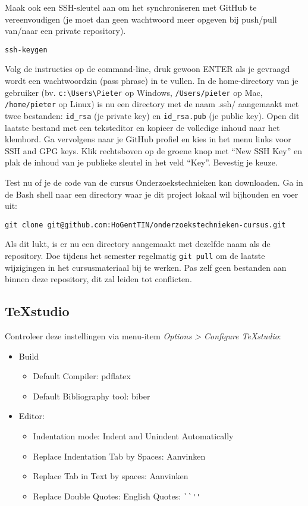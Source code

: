 Maak ook een SSH-sleutel aan om het synchroniseren met GitHub te vereenvoudigen (je moet dan geen wachtwoord meer opgeven bij push/pull van/naar een private repository).

\begin{verbatim}
ssh-keygen
\end{verbatim}

Volg de instructies op de command-line, druk gewoon ENTER als je gevraagd wordt een wachtwoordzin (pass phrase) in te vullen. In de home-directory van je gebruiker (bv. \verb|c:\Users\Pieter| op Windows, \verb|/Users/pieter| op Mac, \verb|/home/pieter| op Linux) is nu een directory met de naam .ssh/ aangemaakt met twee bestanden: \verb|id_rsa| (je private key) en \verb|id_rsa.pub| (je public key). Open dit laatste bestand met een teksteditor en kopieer de volledige inhoud naar het klembord. Ga vervolgens naar je GitHub profiel en kies in het menu links voor SSH and GPG keys. Klik rechtsboven op de groene knop met ``New SSH Key'' en plak de inhoud van je publieke sleutel in het veld ``Key''. Bevestig je keuze.

Test nu of je de code van de cursus Onderzoekstechnieken kan downloaden. Ga in de Bash shell naar een directory waar je dit project lokaal wil bijhouden en voer uit:

\begin{verbatim}
git clone git@github.com:HoGentTIN/onderzoekstechnieken-cursus.git
\end{verbatim}

Als dit lukt, is er nu een directory aangemaakt met dezelfde naam als de repository. Doe tijdens het semester regelmatig \texttt{git pull} om de laatste wijzigingen in het cursusmateriaal bij te werken. Pas zelf geen bestanden aan binnen deze repository, dit zal leiden tot conflicten.

\subsection{TeXstudio}

Controleer deze instellingen via menu-item \emph{Options > Configure TeXstudio}:

\begin{itemize}
  \item Build
  \begin{itemize}
    \item Default Compiler: pdflatex
    \item Default Bibliography tool: biber
  \end{itemize}
  \item Editor:
  \begin{itemize}
    \item Indentation mode: Indent and Unindent Automatically
    \item Replace Indentation Tab by Spaces: Aanvinken
    \item Replace Tab in Text by spaces: Aanvinken
    \item Replace Double Quotes: English Quotes: \verb|``''|
  \end{itemize}

\end{itemize}

